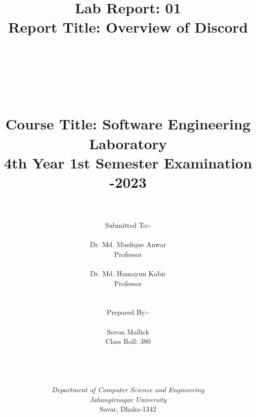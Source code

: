 
\usepackage{graphicx}
\usepackage{adjustbox}
\def\Company{Consultancy}

\def\Course{\textit{Department of Computer Science and Engineering}}
\def\Institute{\textit{Jahangirnagar University}\\{Savar, Dhaka-1342}}
\def\Module{\textit{ }}
\def\Docent{\textit{}}
\def\Assistant{\textit{}}


\def\BoldTitle{Lab Report: 01\\ Report Title: Overview of Discord\\\\}

\def\Subtitle{\\Course Title: Software Engineering Laboratory \\4th Year 1st Semester Examination -2023}
\def\Authors{Prepared By:-\\\\Sovon Mallick\\ Class Roll: 380\\\\ } 
\def\Shortname{A.Sandu}
\def\Docent{Submitted To:-\\\\ Dr. Md. Musfique Anwar\\ Professor\\\\Dr. Md. Humayun Kabir\\Professor\\\\
}
\def\date{}


\title{\textbf{\BoldTitle}\\ \\ \Subtitle}

\author{\date  \\ \\ \Docent \\ \Authors \\ \\ \\ \Course\\ \Institute\\ \\ \\ \Assistant}

